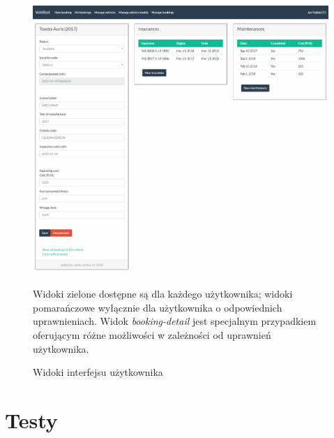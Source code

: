 \documentclass[eng,printmode,openany]{mgr}
\begin{document}
	
	\begin{figure}[h]
		\centering
		\includegraphics[width=\textwidth]{images/test.png}
		\caption{Widoki interfejsu użytkownika}
		\small 
		Widoki zielone dostępne są dla każdego użytkownika; widoki pomarańczowe wyłącznie dla użytkownika o odpowiednich uprawnieniach. Widok \textit{booking-detail} jest specjalnym przypadkiem oferującym różne możliwości w zależności od uprawnień użytkownika.
	\end{figure}
	
	
	\newpage
	\chapter{Testy}
\end{document}
